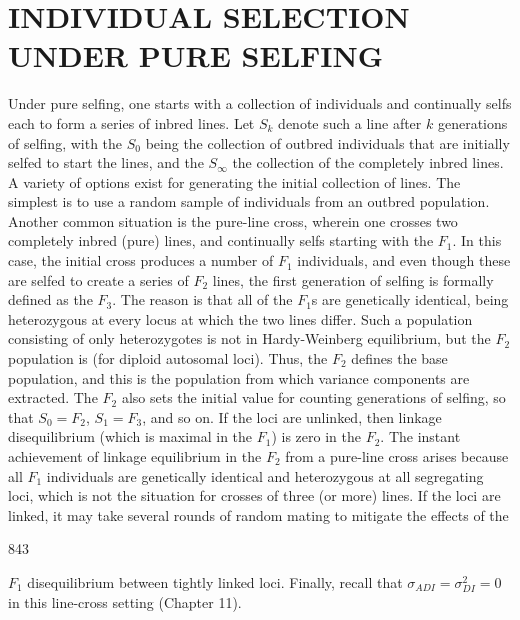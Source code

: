 \documentclass{article}
\begin{document}
\section{INDIVIDUAL SELECTION UNDER PURE SELFING}
Under pure selfing, one starts with a collection of individuals and continually selfs each to form a series of inbred lines. Let $S_k$ denote such a line after $k$ generations of selfing, with the $S_0$ being the collection of outbred individuals that are initially selfed to start the lines, and the $S_\infty$ the collection of the completely inbred lines. A variety of options exist for generating the initial collection of lines. The simplest is to use a random sample of individuals from an outbred population. Another common situation is the pure-line cross, wherein one crosses two completely inbred (pure) lines, and continually selfs starting with the $F_1$. In this case, the initial cross produces a number of $F_1$ individuals, and even though these are selfed to create a series of $F_2$ lines, the first generation of selfing is formally defined as the $F_3$. The reason is that all of the $F_1$s are genetically identical, being heterozygous at every locus at which the two lines differ. Such a population consisting of only heterozygotes is not in Hardy-Weinberg equilibrium, but the $F_2$ population is (for diploid autosomal loci). Thus, the $F_2$ defines the base population, and this is the population from which variance components are extracted. The $F_2$ also sets the initial value for counting generations of selfing, so that $S_0 = F_2$, $S_1 = F_3$, and so on. If the loci are unlinked, then linkage disequilibrium (which is maximal in the $F_1$) is zero in the $F_2$. The instant achievement of linkage equilibrium in the $F_2$ from a pure-line cross arises because all $F_1$ individuals are genetically identical and heterozygous at all segregating loci, which is not the situation for crosses of three (or more) lines. If the loci are linked, it may take several rounds of random mating to mitigate the effects of the

843

 $ F_1 $ disequilibrium between tightly linked loci. Finally, recall that  $ \sigma_{ADI} = \sigma_{DI}^2 = 0 $ in this line-cross setting (Chapter 11).
\end{document}
